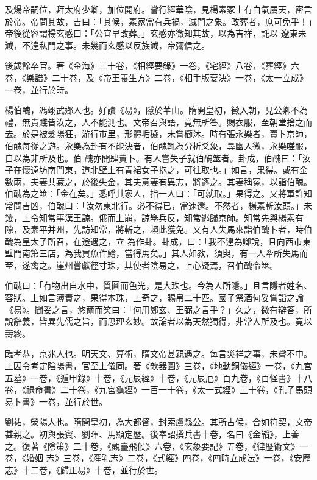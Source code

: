 \begin{pinyinscope}
 及煬帝嗣位，拜太府少卿，加位開府。嘗行經華陰，見楊素冢上有白氣屬天，密言於帝。帝問其故，吉曰：「其候，素家當有兵禍，滅門之象。改葬者，庶可免乎！」帝後從容謂楊玄感曰：「公宜早改葬。」玄感亦微知其故，以為吉祥，託以
 遼東未滅，不遑私門之事。未幾而玄感以反族滅，帝彌信之。



 後歲餘卒官。著《金海》三十卷，《相經要錄》一卷，《宅經》八卷，《葬經》六卷，《樂譜》二十卷，及《帝王養生方》二卷，《相手版要決》一卷，《太一立成》一卷，並行於時。



 楊伯醜，馮翊武鄉人也。好讀《易》，隱於華山。隋開皇初，徵入朝，見公卿不為禮，無貴賤皆汝之，人不能測也。文帝召與語，竟無所答。賜衣服，至朝堂捨之而去。於是被髮陽狂，游行市里，形體垢穢，未嘗櫛沐。時有張永樂者，賣卜京師，伯醜每從之遊。永樂為卦有不能決者，伯醜輒為分析爻象，尋幽入微，永樂嗟服，自以為非所及也。伯
 醜亦開肆賣卜。有人嘗失子就伯醜筮者。卦成，伯醜曰：「汝子在懷遠坊南門東，道北壁上有青裙女子抱之，可往取也。」如言，果得。或有金數兩，夫妻共藏之，於後失金，其夫意妻有異志，將逐之。其妻稱冤，以詣伯醜。伯醜為之筮：「金在矣。」悉呼其家人，指一人曰：「可就取。」果得之。又將軍許知常問吉凶，伯醜曰：「汝勿東北行。必不得已，當速還。不然者，楊素斬汝頭。」未幾，上令知常事漢王諒。俄而上崩，諒舉兵反，知常逃歸京師。知常先與楊素有隙，及素平并州，先訪知常，將斬之，賴此獲免。又有人失馬來詣伯醜卜者，時伯醜為皇太子所召，在途遇之，立
 為作卦。卦成，曰：「我不遑為卿說，且向西市東壁門南第三店，為我買魚作鱠，當得馬矣。」其人如教，須臾，有一人牽所失馬而至，遂禽之。崖州嘗獻徑寸珠，其使者陰易之，上心疑焉，召伯醜令筮。



 伯醜曰：「有物出自水中，質圓而色光，是大珠也。今為人所隱。」且言隱者姓名、容狀。上如言簿責之，果得本珠，上奇之，賜帛二十匹。國子祭酒何妥嘗詣之論《易》。聞妥之言，悠爾而笑曰：「何用鄭玄、王弼之言乎？」久之，微有辯答，所說辭義，皆異先儒之旨，而思理玄妙。故論者以為天然獨得，非常人所及也。竟以壽終。



 臨孝恭，京兆人也。明天文、算術，隋文帝甚親遇之。每言災祥之事，未嘗不中。上因令考定陰陽書，官至上儀同。著《欹器圖》三卷，《地動銅儀經》一卷，《九宮五墓》一卷，《遁甲錄》十卷，《元辰經》十卷，《元辰厄》百九卷，《百怪書》十八卷，《祿命書》二十卷，《九宮龜經》一百一十卷，《太一式經》三十卷，《孔子馬頭易卜書》一卷，並行於世。



 劉祐，滎陽人也。隋開皇初，為大都督，封索盧縣公。其所占候，合如符契，文帝甚親之。初與張賓、劉暉、馬顯定歷。後奉詔撰兵書十卷，名曰《金韜》，上善之。復著《陰策》二十卷，《觀臺飛候》六卷，《玄象要記》五卷，《律歷術文》一卷，《婚姻
 志》三卷，《產乳志》二卷，《式經》四卷，《四時立成法》一卷，《安歷志》十二卷，《歸正易》十卷，並行於世。




\end{pinyinscope}
